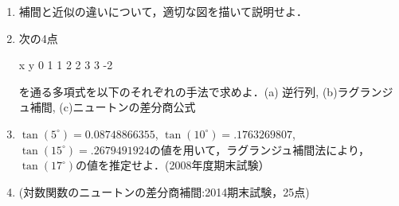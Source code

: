 \begin{enumerate}
\item 補間と近似の違いについて，適切な図を描いて説明せよ．

\item 次の4点
\begin{MapleInput}
x y 
0 1 
1 2
2 3
3 -2
\end{MapleInput}
を通る多項式を以下のそれぞれの手法で求めよ．(a) 逆行列, (b)ラグランジュ補間, (c)ニュートンの差分商公式　
\item
$\tan(5^\circ)=0.08748866355$, 
$\tan(10^\circ)=.1763269807$,
$\tan(15^\circ)=.2679491924$の値を用いて，ラグランジュ補間法により，$\tan(17^\circ)$の値を推定せよ．(2008年度期末試験）

\item
(対数関数のニュートンの差分商補間:2014期末試験，25点) 


\end{enumerate}
